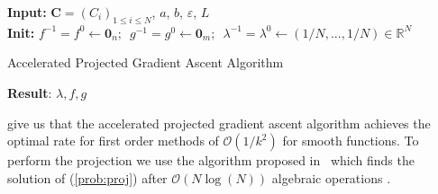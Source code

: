 \begin{algorithm}[H]
\SetAlgoLined
\textbf{Input:} $\mathbf{C}=(C_i)_{1\leq i\leq N}$, $a$, $b$, $\varepsilon$, $L$\\
\textbf{Init:} $f^{-1}=f^0 \leftarrow \mathbf{0}_n\text{;  }$ $g^{-1} = g^0 \leftarrow \mathbf{0}_m\text{;  }$ $\lambda^{-1} = \lambda^0 \leftarrow (1/N,...,1/N)\in\mathbb{R}^N$\\
\caption{Accelerated Projected Gradient Ascent Algorithm\label{algo:Proj-grad}}
\textbf{Result}: $\lambda,f,g$
\end{algorithm}

\cite{beck2009fast,tseng2008accelerated} give us that the accelerated projected gradient ascent algorithm achieves the optimal rate for first order methods of $\mathcal{O}(1/k^2)$ for smooth functions. To perform the projection we use the algorithm proposed in~\cite{shalev2006efficient} which finds the solution of (\ref{prob:proj}) after $\mathcal{O}(N\log(N))$ algebraic operations \citep{wang2013projection}.








